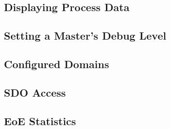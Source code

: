 \documentclass[a4paper,12pt,BCOR=6mm,bibtotoc,idxtotoc]{scrbook}
\begin{document}

\subsection{Displaying Process Data}




\subsection{Setting a Master's Debug Level}
\label{sec:ethercat-debug}




\subsection{Configured Domains}




\subsection{SDO Access}






\subsection{EoE Statistics}



\end{document}
